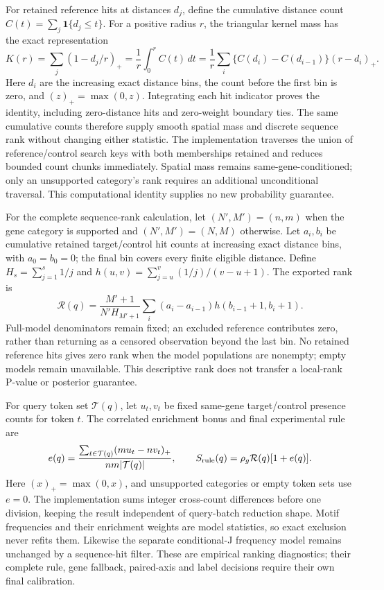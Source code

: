 \documentclass[10pt,a4paper]{article}
\theoremstyle{definition}
\begin{document}
For retained reference hits at distances $d_j$, define the cumulative distance count $C(t)=\sum_j\mathbf1\{d_j\le t\}$.
For a positive radius $r$, the triangular kernel mass has the exact representation
\[
 K(r)=\sum_j(1-d_j/r)_+
 =\frac1r\int_0^r C(t)\,dt
 =\frac1r\sum_i\{C(d_i)-C(d_{i-1})\}(r-d_i)_+.
\]
Here $d_i$ are the increasing exact distance bins, the count before the first bin is zero, and $(z)_+=\max(0,z)$.
Integrating each hit indicator proves the identity, including zero-distance hits and zero-weight boundary ties.
The same cumulative counts therefore supply smooth spatial mass and discrete sequence rank without changing either statistic.
The implementation traverses the union of reference/control search keys with both memberships retained and reduces bounded count chunks immediately.
Spatial mass remains same-gene-conditioned; only an unsupported category's rank requires an additional unconditional traversal.
This computational identity supplies no new probability guarantee.

For the complete sequence-rank calculation, let $(N',M')=(n,m)$ when the gene category is supported and $(N',M')=(N,M)$ otherwise.
Let $a_i,b_i$ be cumulative retained target/control hit counts at increasing exact distance bins, with $a_0=b_0=0$; the final bin covers every finite eligible distance.
Define $H_s=\sum_{j=1}^s1/j$ and $h(u,v)=\sum_{j=u}^{v}(1/j)/(v-u+1)$.
The exported rank is
\[
 \mathcal R(q)=\frac{M'+1}{N'H_{M'+1}}
 \sum_i(a_i-a_{i-1})h(b_{i-1}+1,b_i+1).
\]
Full-model denominators remain fixed; an excluded reference contributes zero, rather than returning as a censored observation beyond the last bin.
No retained reference hits gives zero rank when the model populations are nonempty; empty models remain unavailable.
This descriptive rank does not transfer a local-rank P-value or posterior guarantee.

For query token set $\mathcal T(q)$, let $u_t,v_t$ be fixed same-gene target/control presence counts for token $t$.
The correlated enrichment bonus and final experimental rule are
\[
 e(q)=\frac{\sum_{t\in\mathcal T(q)}(m u_t-n v_t)_+}{nm|\mathcal T(q)|},\qquad
 S_{\rm rule}(q)=\rho_g\mathcal R(q)[1+e(q)].
\]
Here $(x)_+=\max(0,x)$, and unsupported categories or empty token sets use $e=0$.
The implementation sums integer cross-count differences before one division, keeping the result independent of query-batch reduction shape.
Motif frequencies and their enrichment weights are model statistics, so exact exclusion never refits them.
Likewise the separate conditional-J frequency model remains unchanged by a sequence-hit filter.
These are empirical ranking diagnostics; their complete rule, gene fallback, paired-axis and label decisions require their own final calibration.
\end{document}
